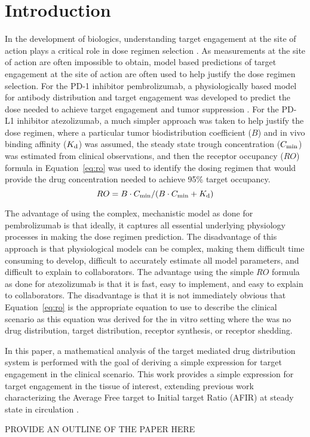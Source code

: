 \section{Introduction}
In the development of biologics, understanding target engagement at the site of action plays a critical role in dose regimen selection \cite{wang16}.  As measurements at the site of action are often impossible to obtain, model based predictions of target engagement at the site of action are often used to help justify the dose regimen selection.  For the PD-1 inhibitor pembrolizumab, a physiologically based model for antibody distribution and target engagement was developed to predict the dose needed to achieve target engagement and tumor suppression \cite{lindauer17}.  For the PD-L1 inhibitor atezolizumab, a much simpler approach was taken to help justify the dose regimen, where a particular tumor biodistribution coefficient ($B$) and in vivo binding affinity ($K_\text{d}$) was assumed, the steady state trough concentration ($C_\text{min}$) was estimated from clinical observations, and then the receptor occupancy ($RO$) formula in Equation~\ref{eq:ro} was used to identify the dosing regimen that would provide the drug concentration needed to achieve 95\% target occupancy.
\begin{equation}
RO = B\cdot C_\text{min}/(B\cdot C_\text{min}+K_\text{d})
\label{eq:ro}
\end{equation}

The advantage of using the complex, mechanistic model as done for pembrolizumab is that ideally, it captures all essential underlying physiology processes in making the dose regimen prediction.  The disadvantage of this approach is that physiological models can be complex, making them difficult time consuming to develop, difficult to accurately estimate all model parameters, and difficult to explain to collaborators.  The advantage using the simple $RO$ formula as done for atezolizumab is that it is fast, easy to implement, and easy to explain to collaborators.  The disadvantage is that it is not immediately obvious that Equation~\ref{eq:ro} is the appropriate equation to use to describe the clinical scenario as this equation was derived for the in vitro setting \cite{boeynaems80} where the was no drug distribution, target distribution, receptor synthesis, or receptor shedding.

In this paper, a mathematical analysis of the target mediated drug distribution system is performed with the goal of deriving a simple expression for target engagement in the clinical scenario.  This work provides a simple expression for target engagement in the tissue of interest, extending previous work characterizing the Average Free target to Initial target Ratio (AFIR) at steady state in circulation \cite{stein17}.

PROVIDE AN OUTLINE OF THE PAPER HERE